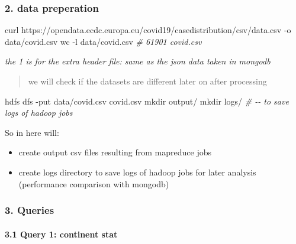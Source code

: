 \documentclass[
]{article}
\newenvironment{Shaded}{}{}
\newcommand{\AttributeTok}[1]{\textcolor[rgb]{0.49,0.56,0.16}{#1}}
\newcommand{\CommentTok}[1]{\textcolor[rgb]{0.38,0.63,0.69}{\textit{#1}}}
\newcommand{\ExtensionTok}[1]{#1}
\newcommand{\FunctionTok}[1]{\textcolor[rgb]{0.02,0.16,0.49}{#1}}
\newcommand{\NormalTok}[1]{#1}
\providecommand{\tightlist}{%
  \setlength{\itemsep}{0pt}\setlength{\parskip}{0pt}}
\begin{document}
\hypertarget{data-preperation-1}{%
\subsubsection{2. data preperation}\label{data-preperation-1}}

\begin{Shaded}
\begin{Highlighting}[]
\ExtensionTok{curl}\NormalTok{ https://opendata.ecdc.europa.eu/covid19/casedistribution/csv/data.csv }\AttributeTok{{-}o}\NormalTok{ data/covid.csv}
\FunctionTok{wc} \AttributeTok{{-}l}\NormalTok{ data/covid.csv }
\CommentTok{\# 61901 covid.csv}
\end{Highlighting}
\end{Shaded}

\emph{the 1 is for the extra header file: same as the json data taken in
mongodb}

\begin{quote}
we will check if the datasets are different later on after processing
\end{quote}

\begin{Shaded}
\begin{Highlighting}[]
\ExtensionTok{hdfs}\NormalTok{ dfs }\AttributeTok{{-}put}\NormalTok{ data/covid.csv covid.csv}
\FunctionTok{mkdir}\NormalTok{ output/}
\FunctionTok{mkdir}\NormalTok{ logs/ }\CommentTok{\# {-}{-} to save logs of hadoop jobs}
\end{Highlighting}
\end{Shaded}

So in here will:

\begin{itemize}
\tightlist
\item
  create output csv files resulting from mapreduce jobs
\item
  create logs directory to save logs of hadoop jobs for later analysis
  (performance comparison with mongodb)
\end{itemize}

\hypertarget{queries}{%
\subsubsection{3. Queries}\label{queries}}

\hypertarget{query-1-continent-stat}{%
\paragraph{3.1 Query 1: continent stat}\label{query-1-continent-stat}}
\end{document}
